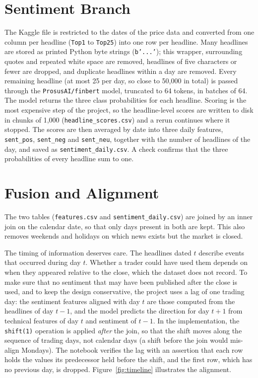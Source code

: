 \section{Sentiment Branch}
The Kaggle file is restricted to the dates of the price data and converted from one column per headline (\texttt{Top1} to \texttt{Top25}) into one row per headline. Many headlines are stored as printed Python byte strings (\texttt{b'...'}); this wrapper, surrounding quotes and repeated white space are removed, headlines of five characters or fewer are dropped, and duplicate headlines within a day are removed. Every remaining headline (at most 25 per day, so close to 50,000 in total) is passed through the \texttt{ProsusAI/finbert} model, truncated to 64 tokens, in batches of 64. The model returns the three class probabilities for each headline. Scoring is the most expensive step of the project, so the headline-level scores are written to disk in chunks of 1,000 (\texttt{headline\_scores.csv}) and a rerun continues where it stopped. The scores are then averaged by date into three daily features, \texttt{sent\_pos}, \texttt{sent\_neg} and \texttt{sent\_neu}, together with the number of headlines of the day, and saved as \texttt{sentiment\_daily.csv}. A check confirms that the three probabilities of every headline sum to one.

\section{Fusion and Alignment}
The two tables (\texttt{features.csv} and \texttt{sentiment\_daily.csv}) are joined by an inner join on the calendar date, so that only days present in both are kept. This also removes weekends and holidays on which news exists but the market is closed.

The timing of information deserves care. The headlines dated $t$ describe events that occurred during day $t$. Whether a trader could have used them depends on when they appeared relative to the close, which the dataset does not record. To make sure that no sentiment that may have been published after the close is used, and to keep the design conservative, the project uses a lag of one trading day: the sentiment features aligned with day $t$ are those computed from the headlines of day $t-1$, and the model predicts the direction for day $t+1$ from technical features of day $t$ and sentiment of $t-1$. In the implementation, the \texttt{shift(1)} operation is applied \emph{after} the join, so that the shift moves along the sequence of trading days, not calendar days (a shift before the join would mis-align Mondays). The notebook verifies the lag with an assertion that each row holds the values its predecessor held before the shift, and the first row, which has no previous day, is dropped. Figure~\ref{fig:timeline} illustrates the alignment.

